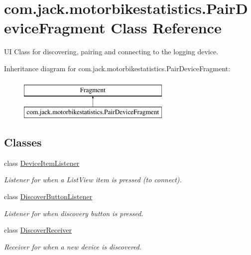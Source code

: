\hypertarget{classcom_1_1jack_1_1motorbikestatistics_1_1_pair_device_fragment}{}\section{com.\+jack.\+motorbikestatistics.\+Pair\+Device\+Fragment Class Reference}
\label{classcom_1_1jack_1_1motorbikestatistics_1_1_pair_device_fragment}


UI Class for discovering, pairing and connecting to the logging device.  


Inheritance diagram for com.\+jack.\+motorbikestatistics.\+Pair\+Device\+Fragment\+:\begin{figure}[H]
\begin{center}
\leavevmode
\includegraphics[height=2.000000cm]{classcom_1_1jack_1_1motorbikestatistics_1_1_pair_device_fragment}
\end{center}
\end{figure}
\subsection*{Classes}
\begin{DoxyCompactItemize}
\item 
class \hyperlink{classcom_1_1jack_1_1motorbikestatistics_1_1_pair_device_fragment_1_1_device_item_listener}{Device\+Item\+Listener}
\begin{DoxyCompactList}\small\item\em Listener for when a List\+View item is pressed (to connect). \end{DoxyCompactList}\item 
class \hyperlink{classcom_1_1jack_1_1motorbikestatistics_1_1_pair_device_fragment_1_1_discover_button_listener}{Discover\+Button\+Listener}
\begin{DoxyCompactList}\small\item\em Listener for when discovery button is pressed. \end{DoxyCompactList}\item 
class \hyperlink{classcom_1_1jack_1_1motorbikestatistics_1_1_pair_device_fragment_1_1_discover_receiver}{Discover\+Receiver}
\begin{DoxyCompactList}\small\item\em Receiver for when a new device is discovered. \end{DoxyCompactList}\end{DoxyCompactItemize}
